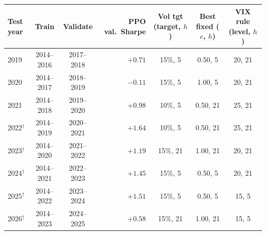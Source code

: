 \begin{tabular}{lccrccc}
\toprule
Test year & Train & Validate & PPO val.\ Sharpe & Vol tgt (target, $h$) & Best fixed ($e$, $h$) & VIX rule (level, $h$) \\
\midrule
2019 & 2014--2016 & 2017--2018 & $+0.71$ & 15\%, 5 & 0.50, 5 & 20, 21 \\
2020 & 2014--2017 & 2018--2019 & $-0.11$ & 15\%, 5 & 1.00, 5 & 20, 21 \\
2021 & 2014--2018 & 2019--2020 & $+0.98$ & 10\%, 5 & 0.50, 21 & 25, 21 \\
2022$^\dagger$ & 2014--2019 & 2020--2021 & $+1.64$ & 10\%, 5 & 0.50, 21 & 25, 21 \\
2023$^\dagger$ & 2014--2020 & 2021--2022 & $+1.19$ & 15\%, 21 & 1.00, 21 & 20, 21 \\
2024$^\dagger$ & 2014--2021 & 2022--2023 & $+1.45$ & 15\%, 5 & 0.50, 5 & 20, 21 \\
2025$^\dagger$ & 2014--2022 & 2023--2024 & $+1.51$ & 15\%, 5 & 0.50, 5 & 15, 5 \\
2026$^\dagger$ & 2014--2023 & 2024--2025 & $+0.58$ & 15\%, 21 & 1.00, 21 & 15, 5 \\
\bottomrule
\end{tabular}
